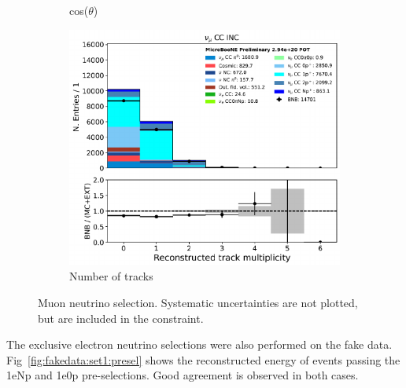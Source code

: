 \begin{figure}[H]
\begin{center}
\begin{subfigure}[b]{0.3\textwidth}
    \caption{\label{fig:fakedata:set1:numu_costheta} cos($\theta$)}
    \end{subfigure}
    \begin{subfigure}[b]{0.3\textwidth}
    \centering
    \includegraphics[width=1.00\textwidth]{Fakedata/set1/numu_ntracks.pdf}
    \caption{\label{fig:fakedata:set1:numu_ntracks} Number of tracks}
    \end{subfigure}
\caption{\label{fig:fakedata:set1:numu} Muon neutrino selection. Systematic uncertainties are not plotted, but are included in the constraint.}
\end{center}
\end{figure}

The exclusive electron neutrino selections were also performed on the fake data. Fig~\ref{fig:fakedata:set1:presel} shows the reconstructed energy of events passing the 1eNp and 1e0p pre-selections.  Good agreement is observed in both cases.

